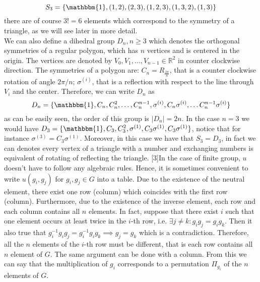 \documentclass[12pt]{book}
\theoremstyle{plain}
\newcommand{\R}{\mathbb{R}}
\newcommand{\I}{\mathbbm{1}}
\theoremstyle{definition}
\theoremstyle{remark}
\begin{document}
\[S_3 = \{\I,(1,2),(2,3),(1,2,3),(1,3,2),(1,3)\}\]
there are of course $3!=6$ elements which correspond to the symmetry of a triangle, as we will see later in more detail.\\ 
We can also define a dihedral group $D_n,n\geq 3$ which denotes the orthogonal symmetries of a regular polygon, which has $n$ vertices and is centered in the origin. The vertices are denoted by $V_0,V_1,\dots,V_{n-1}\in\R^2$ in counter clockwise direction. The symmetries of a polygon are: $C_n = R_{\frac{2\pi}{n}}$, that is a counter clockwise rotation of angle $2\pi/n$; $\sigma^{(i)}$, that is a reflection with respect to the line through $V_i$ and the center. Therefore, we can write $D_n$ as
\[D_n = \{\I, C_n,C_n^2,\dots,C_n^{n-1},\sigma^{(i)},C_n\sigma^{(i)},\dots C_n^{n-1}\sigma^{(i)} \}\]
as can be easily seen, the order of this group is $|D_n| = 2n$. In the case $n=3$ we would have $D_3 = \{\I,C_3,C_3^2,\sigma^{(1)},C_3\sigma^{(1)},C_3\sigma^{(1)}\}$, notice that for instance $\sigma^{(3)} = C_3 \sigma^{(1)}$. Moreover, in this case we have that $S_3 = D_3$, in fact we can denotes every vertex of a triangle with a number and exchanging numbers is equivalent of rotating of reflecting the triangle.
[3]In the case of finite group, $u$ doesn't have to follow any algebraic rules. Hence, it is sometimes convenient to write $u(g_i,g_j)$ for $g_i,g_j\in G$ into a table. Due to the existence of the neutral element, there exist one row (column) which coincides with the first row (column). Furthermore, due to the existence of the inverse element, each row and each column contains all $n$ elements. In fact, suppose that there exist $i$ such that one element occurs at least twice in the $i$-th row, i.e. $\exists j\neq k : g_ig_j = g_ig_k$.  Then it also true that $g_i^{-1}g_ig_j = g_i^{-1}g_ig_k \implies g_j = g_k$ which is a contradiction. Therefore, all the $n$ elements of the $i$-th row must be different, that is each row contains all $n$ element of $G$. The same argument can be done with a column. From this we can say that the multiplication of $g_i$ corresponds to a permutation $\Pi_{g_i}$ of the $n$ elements of $G$.
\end{document}
